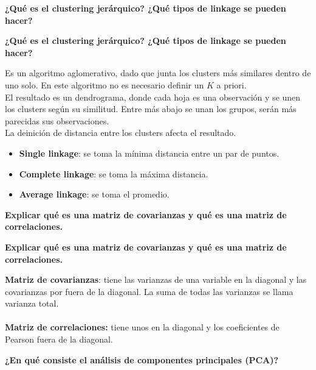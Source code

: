 \documentclass[10pt]{memoir}
\begin{document}
\clearpage
\begin{center}
	\textbf{\Large ¿Qué es el clustering jerárquico? ¿Qué tipos de linkage se pueden hacer?} \\
\end{center}

\clearpage
\begin{center}
	\textbf{\Large ¿Qué es el clustering jerárquico? ¿Qué tipos de linkage se pueden hacer?} \\
\end{center}
\noindent Es un algoritmo aglomerativo, dado que junta los clusters más similares dentro de uno solo. En este algoritmo no es necesario definir un $K$ a priori. \\
El resultado es un dendrograma, donde cada hoja es una observación y se unen los clusters según su similitud. Entre más abajo se unan los grupos, serán más parecidas sus observaciones. \\
La deinición de distancia entre los clusters afecta el resultado.
\begin{itemize}
	\item \textbf{Single linkage}: se toma la mínima distancia entre un par de puntos.
	\item \textbf{Complete linkage}: se toma la máxima distancia.
	\item \textbf{Average linkage}: se toma el promedio.
\end{itemize}

\clearpage
\begin{center}
	\textbf{\Large Explicar qué es una matriz de covarianzas y qué es una matriz de correlaciones.} \\
\end{center}

\clearpage
\begin{center}
	\textbf{\Large Explicar qué es una matriz de covarianzas y qué es una matriz de correlaciones.} \\
\end{center}
\noindent \textbf{Matriz de covarianzas}: tiene las varianzas de una variable en la diagonal y las covarianzas por fuera de la diagonal. La suma de todas las varianzas se llama varianza total. \\
\\
\noindent \textbf{Matriz de correlaciones:} tiene unos en la diagonal y los coeficientes de Pearson fuera de la diagonal.

\clearpage
\begin{center}
	\textbf{\Large ¿En qué consiste el análisis de componentes principales (PCA)?} \\
\end{center}
\end{document}
